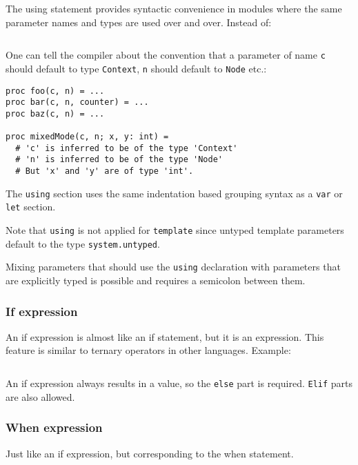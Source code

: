 The using statement provides syntactic convenience in modules where the
same parameter names and types are used over and over. Instead of:

\begin{verbatim}
\end{verbatim}

One can tell the compiler about the convention that a parameter of name
\texttt{c} should default to type \texttt{Context}, \texttt{n} should
default to \texttt{Node} etc.:

\begin{verbatim}
proc foo(c, n) = ...
proc bar(c, n, counter) = ...
proc baz(c, n) = ...

proc mixedMode(c, n; x, y: int) =
  # 'c' is inferred to be of the type 'Context'
  # 'n' is inferred to be of the type 'Node'
  # But 'x' and 'y' are of type 'int'.
\end{verbatim}

The \texttt{using} section uses the same indentation based grouping
syntax as a \texttt{var} or \texttt{let} section.

Note that \texttt{using} is not applied for \texttt{template} since
untyped template parameters default to the type \texttt{system.untyped}.

Mixing parameters that should use the \texttt{using} declaration with
parameters that are explicitly typed is possible and requires a
semicolon between them.

\hypertarget{if-expression}{%
\subsubsection{If expression}\label{if-expression}}

An {if expression} is almost like an if statement, but it is an
expression. This feature is similar to {ternary operators} in other
languages. Example:

\begin{verbatim}
\end{verbatim}

An if expression always results in a value, so the \texttt{else} part is
required. \texttt{Elif} parts are also allowed.

\hypertarget{when-expression}{%
\subsubsection{When expression}\label{when-expression}}

Just like an {if expression}, but corresponding to the when statement.

